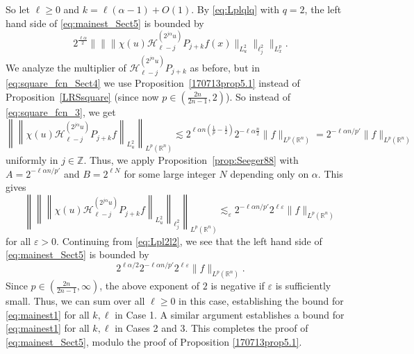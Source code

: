 \documentclass[12pt,leqno]{amsart}
\def\R{\mathbb{R}}
\def\Z{\mathbb{Z}}
\theoremstyle{plain}
\numberwithin{equation}{section}
\begin{document}
So let $\ell \geq 0$ and $k = \ell(\alpha-1) + O(1)$. By \eqref{eq:Lplqlq} with $q = 2$, the left hand side of \eqref{eq:mainest_Sect5} is bounded by 
\begin{equation} \label{eq:Lpl2l2}
2^{\frac{\ell \alpha}{2}}  \| \| \| \chi(u) \mathcal{H}^{(2^{j \alpha} u)}_{\ell-j} P_{j+k} f (x) \|_{L^2_u} \|_{\ell^2_j} \|_{L^p_x}.
\end{equation}
We analyze the multiplier of $\mathcal{H}^{(2^{j \alpha} u)}_{\ell-j} P_{j+k}$ as before, but in \eqref{eq:square_fcn_Sect4} we use Proposition~\ref{170713prop5.1} instead of Proposition~\ref{LRSsquare} (since now $p \in (\frac{2n}{2n-1},2)$). So instead of \eqref{eq:square_fcn_3}, we get
\begin{equation} \label{eq:square_fcn_4}
\left\|  \left\|  \chi(u) \mathcal{H}^{(2^{j \alpha} u)}_{\ell-j} P_{j+k} f \right\|_{L^2_u} \right\|_{L^p(\R^n)}  \lesssim 
2^{\ell \alpha n \left( \frac{1}{p} - \frac{1}{2} \right)} 2^{-\ell \alpha \frac{n}{2}}  \|f\|_{L^p(\R^n)} = 2^{-\ell \alpha n / p'} \|f\|_{L^p(\R^n)}
\end{equation}
uniformly in $j \in \Z$.
Thus, we apply Proposition~\ref{prop:Seeger88} with $A = 2^{-\ell \alpha n / p'}$ and $B = 2^{\ell N}$ for some large integer $N$ depending only on $\alpha$. This gives 
\[ 
\left\| \left\| \left\|  \chi(u) \mathcal{H}^{(2^{j \alpha} u)}_{\ell-j} P_{j+k} f \right\|_{L^2_u} \right\|_{\ell^2_j} \right\|_{L^p(\R^n)}  \lesssim_{\varepsilon} 
 2^{-\ell \alpha n / p'} 2^{\ell \varepsilon} \|f\|_{L^p(\R^n)}
\]
for all $\varepsilon > 0$. Continuing from \eqref{eq:Lpl2l2}, we see that the left hand side of \eqref{eq:mainest_Sect5} is bounded by 
\[
2^{\ell \alpha/2} 2^{-\ell \alpha n / p'} 2^{\ell \varepsilon} \|f\|_{L^p(\R^n)}.
\]
Since $p \in (\frac{2n}{2n-1},\infty)$, the above exponent of $2$ is negative if $\varepsilon$ is sufficiently small. Thus, we can sum over all $\ell \geq 0$ in this case, establishing the bound for \eqref{eq:mainest1} for all $k, \ell$ in Case 1. A similar argument establishes a bound for \eqref{eq:mainest1} for all $k, \ell$ in Cases 2 and 3. This completes the proof of \eqref{eq:mainest_Sect5}, modulo the proof of Proposition \ref{170713prop5.1}.
\end{document}
